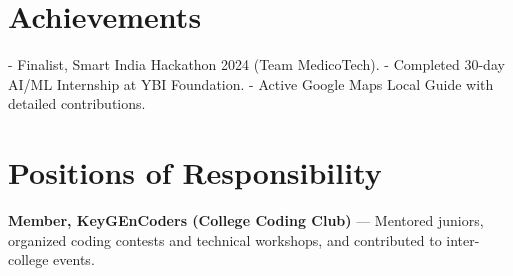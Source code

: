 \section*{Achievements}
- Finalist, Smart India Hackathon 2024 (Team MedicoTech).  
- Completed 30-day AI/ML Internship at YBI Foundation.  
- Active Google Maps Local Guide with detailed contributions.  

\section*{Positions of Responsibility}
\textbf{Member, KeyGEnCoders (College Coding Club)} — Mentored juniors, organized coding contests and technical workshops, and contributed to inter-college events.  


